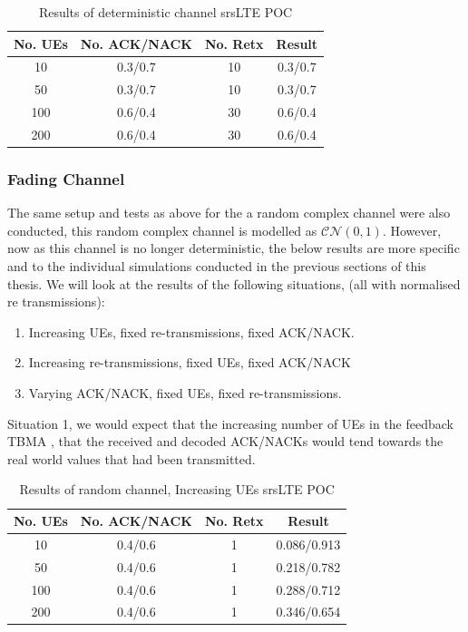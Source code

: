 \documentclass{article}
\begin{document}
\begin{table}[H]
    \centering
 \begin{tabular}{||c c c c||} 
 \hline
 No. UEs & No. ACK/NACK & No. Retx & Result \\ [0.5ex] 
 \hline\hline
 10 & 0.3/0.7 & 10 &  0.3/0.7 \\ 
 \hline
 50 & 0.3/0.7 & 10 & 0.3/0.7 \\
 \hline
 100 & 0.6/0.4 & 30 & 0.6/0.4 \\
 \hline
 200 & 0.6/0.4 & 30 & 0.6/0.4 \\ [1ex] 
 \hline
\end{tabular}
    \caption{Results of deterministic channel srsLTE POC}
    \label{tab:my_label}
\end{table}

\subsubsection{Fading Channel}
The same setup and tests as above for the a random complex channel were also conducted, this random complex channel is modelled as $\mathcal{CN}(0,1)$. However, now as this channel is no longer deterministic, the below results are more specific and to the individual simulations conducted in the previous sections of this thesis. We will look at the results of the following situations, (all with normalised re transmissions):

\begin{enumerate}
    \item Increasing UEs, fixed re-transmissions, fixed ACK/NACK. 
    \item Increasing re-transmissions, fixed UEs, fixed ACK/NACK
    \item Varying ACK/NACK, fixed UEs, fixed re-transmissions.
\end{enumerate}

Situation 1, we would expect that the increasing number of UEs in the feedback TBMA , that the received and decoded ACK/NACKs would tend towards the real world values that had been transmitted. 

\begin{table}[H]
    \centering
 \begin{tabular}{||c c c c||} 
 \hline
 No. UEs & No. ACK/NACK & No. Retx & Result \\ [0.5ex] 
 \hline\hline
 10 & 0.4/0.6 & 1 &  0.086/0.913 \\ 
 \hline
 50 & 0.4/0.6 & 1 & 0.218/0.782 \\
 \hline
 100 & 0.4/0.6 & 1 & 0.288/0.712 \\
 \hline
 200 & 0.4/0.6 & 1 & 0.346/0.654 \\ [1ex] 
 \hline
\end{tabular}
    \caption{Results of random channel, Increasing UEs srsLTE POC}
    \label{tab:rand_chan_UEs_increase}
\end{table}
\end{document}
